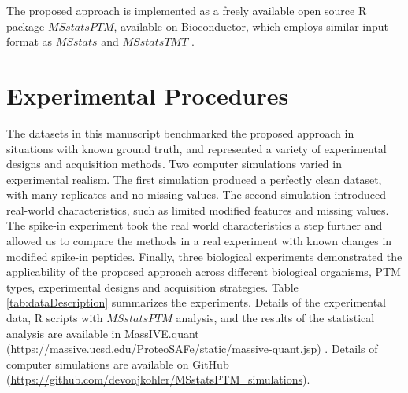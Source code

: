 \documentclass[mcp]{article}
\numberwithin{table}{section}
\begin{document}
The proposed approach is implemented as a freely available open source R package $MSstatsPTM$, available on Bioconductor, which employs similar input format as $MSstats$ and $MSstatsTMT$ \cite{Choi:2014,Huang:2020}.

\section{Experimental Procedures}

The datasets in this manuscript  benchmarked the proposed approach in situations with known ground truth, and represented a variety of experimental designs and acquisition methods. Two computer simulations varied in experimental realism. The first simulation produced a perfectly clean dataset, with many replicates and no missing values. The second simulation introduced real-world characteristics, such as limited modified features and missing values. The spike-in experiment took the real world characteristics a step further and allowed us to compare the methods in a real experiment with known changes in modified spike-in peptides. Finally, three biological experiments demonstrated the applicability of the proposed approach across different biological organisms, PTM types, experimental designs and acquisition strategies. Table \ref{tab:dataDescription} summarizes the experiments. Details of the experimental data, R scripts with $MSstatsPTM$ analysis, and the results of the statistical analysis are available in MassIVE.quant (\url{https://massive.ucsd.edu/ProteoSAFe/static/massive-quant.jsp}) \cite{Choi:2020}. Details of computer simulations are available on GitHub (\url{https://github.com/devonjkohler/MSstatsPTM_simulations}).
\end{document}
